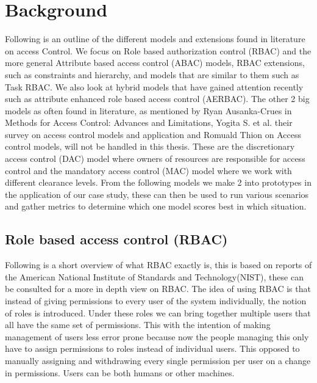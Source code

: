\chapter{Background}
\label{chapt:Background}
Following is an outline of the different models and extensions found in literature on access Control.
We focus on Role based authorization control (RBAC) and the more general Attribute based access control (ABAC) models, RBAC extensions, such as constraints and hierarchy, and models that are similar to them such as Task RBAC.
We also look at hybrid models that have gained attention recently such as attribute enhanced role based access control (AERBAC).
The other 2 big models as often found in literature, as mentioned by Ryan Ausanka-Crues in Methods for Access Control: Advances and Limitations\cite{SurveyAC2}, Yogita S. et al. their survey on access control models and application\cite{SurveyAC} and  Romuald Thion on Access control models\cite{MACDAC}, will not be handled in this thesis.
These are the discretionary access control (DAC) model  where owners of resources are responsible for access control and the mandatory access control (MAC) model where we work with different clearance levels.
From the following models we make 2 into prototypes in the application of our case study, these can then be used to run various scenarios and gather metrics to determine which one model scores best in which situation.

\section{Role based access control (RBAC)}
Following is a short overview of what RBAC exactly is, this is based on reports of the American National Institute of Standards and Technology(NIST), these can be consulted for a more in depth view on RBAC\cite{Overview1}.
The idea of using RBAC is that instead of giving permissions to every user of the system individually, the notion of roles is introduced.
Under these roles we can bring together multiple users that all have the same set of permissions.
This with the intention of making management of users less error prone because now the people managing this only have to assign permissions to roles instead of individual users.
This opposed to manually assigning and withdrawing every single permission per user on a change in permissions.
Users can be both humans or other machines.

